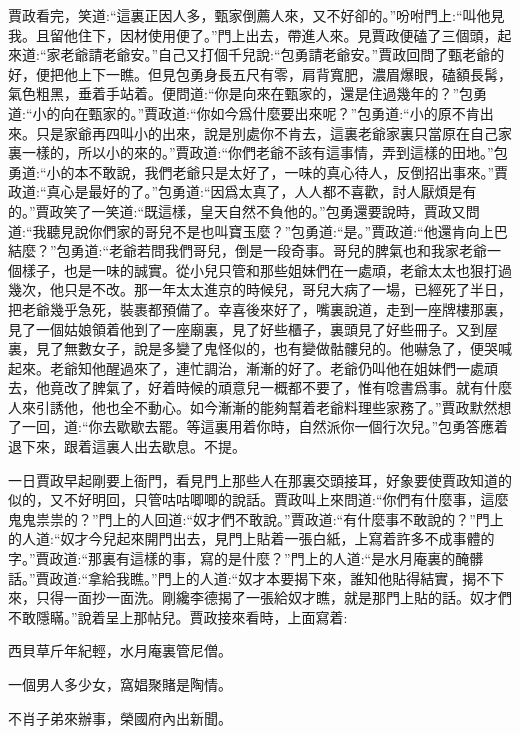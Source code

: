 \begin{parag}
    賈政看完，笑道:“這裏正因人多，甄家倒薦人來，又不好卻的。”吩咐門上:“叫他見我。且留他住下，因材使用便了。”門上出去，帶進人來。見賈政便磕了三個頭，起來道:“家老爺請老爺安。”自己又打個千兒說:“包勇請老爺安。”賈政回問了甄老爺的好，便把他上下一瞧。但見包勇身長五尺有零，肩背寬肥，濃眉爆眼，磕額長髯，氣色粗黑，垂着手站着。便問道:“你是向來在甄家的，還是住過幾年的？”包勇道:“小的向在甄家的。”賈政道:“你如今爲什麼要出來呢？”包勇道:“小的原不肯出來。只是家爺再四叫小的出來，說是別處你不肯去，這裏老爺家裏只當原在自己家裏一樣的，所以小的來的。”賈政道:“你們老爺不該有這事情，弄到這樣的田地。”包勇道:“小的本不敢說，我們老爺只是太好了，一味的真心待人，反倒招出事來。”賈政道:“真心是最好的了。”包勇道:“因爲太真了，人人都不喜歡，討人厭煩是有的。”賈政笑了一笑道:“既這樣，皇天自然不負他的。”包勇還要說時，賈政又問道:“我聽見說你們家的哥兒不是也叫寶玉麼？”包勇道:“是。”賈政道:“他還肯向上巴結麼？”包勇道:“老爺若問我們哥兒，倒是一段奇事。哥兒的脾氣也和我家老爺一個樣子，也是一味的誠實。從小兒只管和那些姐妹們在一處頑，老爺太太也狠打過幾次，他只是不改。那一年太太進京的時候兒，哥兒大病了一場，已經死了半日，把老爺幾乎急死，裝裹都預備了。幸喜後來好了，嘴裏說道，走到一座牌樓那裏，見了一個姑娘領着他到了一座廟裏，見了好些櫃子，裏頭見了好些冊子。又到屋裏，見了無數女子，說是多變了鬼怪似的，也有變做骷髏兒的。他嚇急了，便哭喊起來。老爺知他醒過來了，連忙調治，漸漸的好了。老爺仍叫他在姐妹們一處頑去，他竟改了脾氣了，好着時候的頑意兒一概都不要了，惟有唸書爲事。就有什麼人來引誘他，他也全不動心。如今漸漸的能夠幫着老爺料理些家務了。”賈政默然想了一回，道:“你去歇歇去罷。等這裏用着你時，自然派你一個行次兒。”包勇答應着退下來，跟着這裏人出去歇息。不提。
\end{parag}


\begin{parag}
    一日賈政早起剛要上衙門，看見門上那些人在那裏交頭接耳，好象要使賈政知道的似的，又不好明回，只管咕咕唧唧的說話。賈政叫上來問道:“你們有什麼事，這麼鬼鬼祟祟的？”門上的人回道:“奴才們不敢說。”賈政道:“有什麼事不敢說的？”門上的人道:“奴才今兒起來開門出去，見門上貼着一張白紙，上寫着許多不成事體的字。”賈政道:“那裏有這樣的事，寫的是什麼？”門上的人道:“是水月庵裏的醃髒話。”賈政道:“拿給我瞧。”門上的人道:“奴才本要揭下來，誰知他貼得結實，揭不下來，只得一面抄一面洗。剛纔李德揭了一張給奴才瞧，就是那門上貼的話。奴才們不敢隱瞞。”說着呈上那帖兒。賈政接來看時，上面寫着:
\end{parag}


\begin{poem}
    \begin{pl}
        西貝草斤年紀輕，水月庵裏管尼僧。
    \end{pl}


    \begin{pl}
        一個男人多少女，窩娼聚賭是陶情。
    \end{pl}


    \begin{pl}
        不肖子弟來辦事，榮國府內出新聞。
    \end{pl}
\end{poem}



